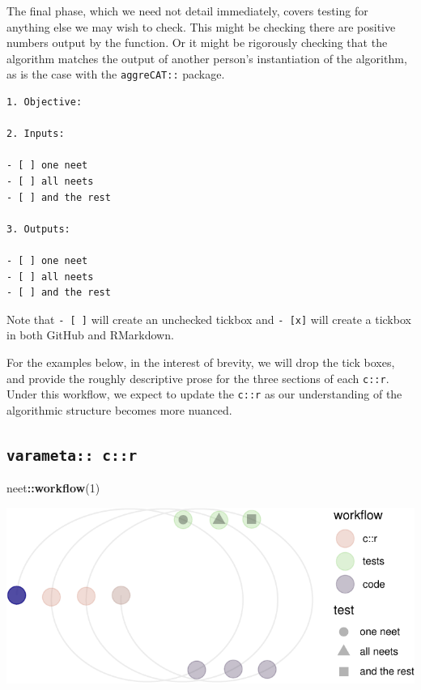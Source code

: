 \documentclass[
]{article}
\newenvironment{Shaded}{\begin{snugshade}}{\end{snugshade}}
\newcommand{\DecValTok}[1]{\textcolor[rgb]{0.00,0.00,0.81}{#1}}
\newcommand{\KeywordTok}[1]{\textcolor[rgb]{0.13,0.29,0.53}{\textbf{#1}}}
\newcommand{\NormalTok}[1]{#1}
\newcommand{\OperatorTok}[1]{\textcolor[rgb]{0.81,0.36,0.00}{\textbf{#1}}}
\begin{document}
The final phase, which we need not detail immediately, covers testing for anything else we may wish to check. This might be checking there are positive numbers output by the function. Or it might be rigorously checking that the algorithm matches the output of another person's instantiation of the algorithm, as is the case with the \texttt{aggreCAT::} package.

\begin{verbatim}
1. Objective:

2. Inputs:

- [ ] one neet
- [ ] all neets
- [ ] and the rest

3. Outputs:

- [ ] one neet
- [ ] all neets
- [ ] and the rest
\end{verbatim}

Note that \texttt{-\ {[}\ {]}} will create an unchecked tickbox and \texttt{-\ {[}x{]}} will create a tickbox in both GitHub and RMarkdown.

For the examples below, in the interest of brevity, we will drop the tick boxes, and provide the roughly descriptive prose for the three sections of each \texttt{c::r}. Under this workflow, we expect to update the \texttt{c::r} as our understanding of the algorithmic structure becomes more nuanced.

\hypertarget{varameta-cr}{%
\subsection{\texorpdfstring{\texttt{varameta::\ c::r}}{varameta:: c::r}}\label{varameta-cr}}

\begin{Shaded}
\begin{Highlighting}[]
\NormalTok{neet}\OperatorTok{::}\KeywordTok{workflow}\NormalTok{(}\DecValTok{1}\NormalTok{)}
\end{Highlighting}
\end{Shaded}

\begin{center}\includegraphics{when-is-done-done_files/figure-latex/unnamed-chunk-4-1} \end{center}
\end{document}
